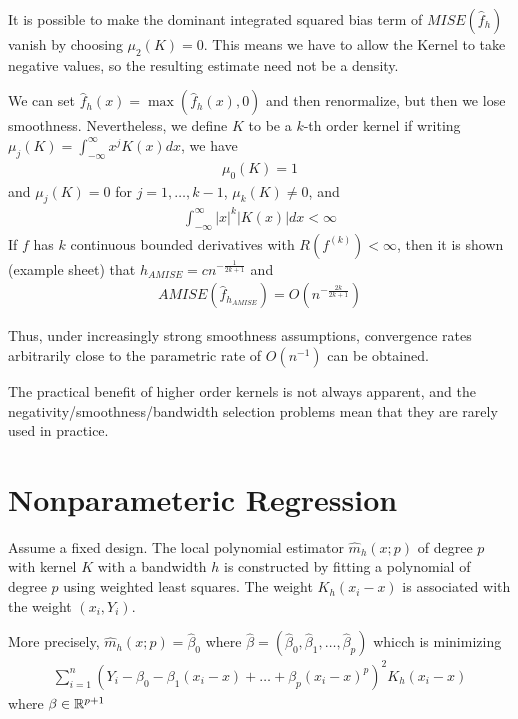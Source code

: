\begin{thm}
  It is possible to make the dominant integrated squared bias term of
  $MISE(\hat f_{h})$ vanish by choosing $\mu_{2}(K) = 0$. This means
  we have to allow the Kernel to take negative values, so the
  resulting estimate need not be a density.

  We can set $\hat f_{h}(x) = \max (\hat f_{h}(x), 0)$ and then
  renormalize, but then we lose smoothness. Nevertheless, we define
  $K$ to be a $k$-th order kernel if writing $\mu_{j}(K) =
  \int_{-\infty}^{\infty} x^{j} K(x) dx$, we have
  \begin{align}
    \label{eq:42}
    \mu_{0}(K) = 1
  \end{align} and $\mu_{j}(K) = 0$ for $j = 1, \dots, k - 1$,
  $\mu_{k}(K) \neq 0$, and
  \begin{align}
    \label{eq:43}
    \int_{-\infty}^{\infty} |x|^{k} |K(x)| dx < \infty
  \end{align} If $f$ has $k$ continuous bounded derivatives with
  $R(f^{(k)}) < \infty$, then it is shown (example sheet) that
  $h_{AMISE} = c n^{-\frac{1}{2k+1}}$ and
  \begin{align}
    \label{eq:44}
    AMISE(\hat f_{h_{AMISE}}) = O(n^{-\frac{2k}{2k+1}})
  \end{align}

  Thus, under increasingly strong smoothness assumptions, convergence
  rates arbitrarily close to the parametric rate of $O(n^{-1})$ can be
  obtained.

  The practical benefit of higher order kernels is not always
  apparent, and the negativity/smoothness/bandwidth selection problems
  mean that they are rarely used in practice.
\end{thm}

\section{Nonparameteric Regression}
\label{sec:nonp-regr}

Assume a fixed design.  The local polynomial estimator $\hat m_{h}(x;
p)$ of degree $p$ with kernel $K$ with a bandwidth $h$ is constructed
by fitting a polynomial of degree $p$ using weighted least squares.
The weight $K_{h}(x_{i} - x)$ is associated with the weight $(x_{i},
Y_{i})$.

More precisely, $\hat m_{h}(x; p) = \hat \beta_{0}$ where $\hat \beta =
(\hat \beta_{0}, \hat \beta_{1}, \dots, \hat \beta_{p})$ whicch is
minimizing
\begin{align}
  \label{eq:52}
  \sum_{i=1}^{n} (Y_{i} - \beta_{0} - \beta_{1}(x_{i} - x) + \dots +
  \beta_{p}(x_{i} - x)^{p})^{2} K_{h}(x_{i} - x)
\end{align} where $\beta \in \mathbb{R}^{p+1}$

